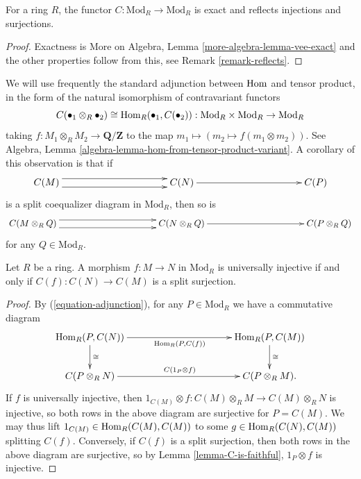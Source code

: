 \begin{lemma}
\label{lemma-C-is-faithful}
For a ring $R$, the functor $C : \text{Mod}_R \to \text{Mod}_R$ is
exact and reflects injections and surjections.
\end{lemma}

\begin{proof}
Exactness is More on Algebra, Lemma \ref{more-algebra-lemma-vee-exact}
and the other properties follow from this, see
Remark \ref{remark-reflects}.
\end{proof}

\begin{remark}
\label{remark-adjunction}
We will use frequently the standard adjunction between $\mathop{\mathrm{Hom}}\nolimits$ and tensor 
product, in the form of the natural isomorphism of contravariant functors
\begin{equation}
\label{equation-adjunction}
C(\bullet_1 \otimes_R \bullet_2) \cong \mathop{\mathrm{Hom}}\nolimits_R(\bullet_1, C(\bullet_2)): 
\text{Mod}_R \times \text{Mod}_R \to \text{Mod}_R
\end{equation}
taking $f: M_1 \otimes_R M_2 \to \mathbf{Q}/\mathbf{Z}$ to the map $m_1 \mapsto 
(m_2 \mapsto f(m_1 \otimes m_2))$. See
Algebra, Lemma \ref{algebra-lemma-hom-from-tensor-product-variant}.
A corollary of this observation is that if
$$
\xymatrix@C=9pc{
C(M) \ar@<1ex>[r] \ar@<-1ex>[r] & C(N) \ar[r] & C(P)
}
$$
is a split coequalizer diagram in $\text{Mod}_R$, then so is
$$
\xymatrix@C=9pc{
C(M \otimes_R Q) \ar@<1ex>[r] \ar@<-1ex>[r] & C(N \otimes_R Q) \ar[r] & C(P 
\otimes_R Q)
}
$$
for any $Q \in \text{Mod}_R$.
\end{remark}

\begin{lemma}
\label{lemma-split-surjection}
Let $R$ be a ring. A morphism $f: M \to N$ in $\text{Mod}_R$ is universally
injective if and only if $C(f): C(N) \to C(M)$ is a split surjection.
\end{lemma}

\begin{proof}
By (\ref{equation-adjunction}), for any $P \in \text{Mod}_R$ we have a 
commutative diagram
$$
\xymatrix@C=9pc{
\Hom_R( P, C(N)) \ar[r]_{\Hom_R(P,C(f))} \ar[d]^{\cong} &
\Hom_R(P,C(M)) \ar[d]^{\cong} \\
C(P \otimes_R N ) \ar[r]^{C(1_{P} \otimes f)} & C(P \otimes_R M ).
}
$$
If $f$ is universally injective, then $1_{C(M)} \otimes f: C(M) \otimes_R M \to 
C(M) \otimes_R N$ is injective,
so both rows in the above diagram are surjective for $P = C(M)$. We may thus 
lift
$1_{C(M)} \in \mathop{\mathrm{Hom}}\nolimits_R(C(M), C(M))$ to some $g \in \mathop{\mathrm{Hom}}\nolimits_R(C(N), C(M))$ splitting 
$C(f)$.
Conversely, if $C(f)$ is a split surjection, then 
both rows in the above diagram are surjective,
so by Lemma \ref{lemma-C-is-faithful}, $1_{P} \otimes f$ is injective.
\end{proof}

